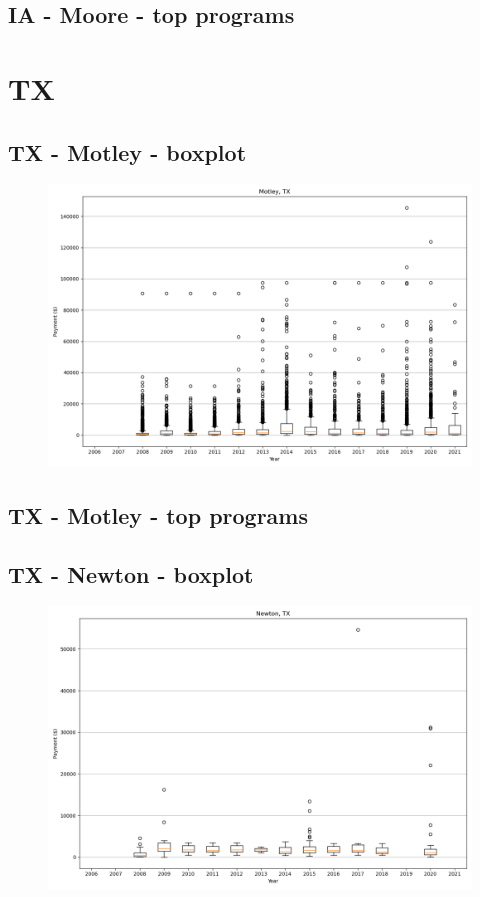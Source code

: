 \subsection*{IA - Moore - top programs}

\newpage
\section*{TX}
\subsection*{TX - Motley - boxplot}
\begin{figure}[h]
\centering
\includegraphics[width=7in]{../output/boxplots/counties/Motley-TX_boxplot.png}
\end{figure}


\subsection*{TX - Motley - top programs}

\newpage
\subsection*{TX - Newton - boxplot}
\begin{figure}[h]
\centering
\includegraphics[width=7in]{../output/boxplots/counties/Newton-TX_boxplot.png}
\end{figure}


